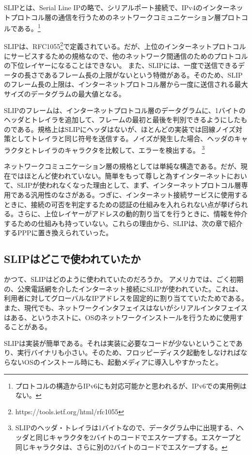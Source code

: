 SLIPとは、Serial Line IPの略で、シリアルポート接続で、IPv4のインターネットプロトコル層の通信を行うためのネットワークコミュニケーション層プロトコルである。\footnote{プロトコルの構造からIPv6にも対応可能かと思われるが、IPv6での実用例はない。}

SLIPは、RFC1055\footnote{https://tools.ietf.org/html/rfc1055}で定義されている。だが、上位のインターネットプロトコルにサービスするための規格なので、他のネットワーク間通信のためのプロトコルの下位レイヤーになることはできない。
また、SLIPには、一度で送信できるデータの長さであるフレーム長の上限がないという特徴がある。そのため、SLIPのフレーム長の上限は、インターネットプロトコル層から一度に送信される最大サイズのデータグラムの最大値となる。

SLIPのフレームは、インターネットプロトコル層のデータグラムに、1バイトのヘッダとトレイラを追加して、フレームの最初と最後を判別できるようにしたものである。規格上はSLIPにヘッダはないが、ほとんどの実装では回線ノイズ対策としてトレイラと同じ符号を送信する。ノイズが発生した場合、ヘッダのキャラクタとトレイラのキャラクタを比較して、エラーを検出する。
\footnote{SLIPのヘッダ・トレイラは1バイトなので、データグラム中に出現する、ヘッダと同じキャラクタを2バイトのコードでエスケープする。エスケープと同じキャラクタは、さらに別の2バイトのコードでエスケープする。}

ネットワークコミュニケーション層の規格としては単純な構造である。だが、現在ではほとんど使われていない。簡単をもって尊しと為すインターネットにおいて、SLIPが使われなくなった理由として、まず、インターネットプロトコル層専用である汎用性のなさがある。つぎに、インターネット接続サービスに使用するときに、接続の可否を判定するための認証の仕組みを入れられない点が挙げられる。さらに、上位レイヤーがアドレスの動的割り当てを行うときに、情報を仲介するための仕組みも持っていない。これらの理由から、SLIPは、次の章で紹介するPPPに置き換えられていった。

\subsection{SLIPはどこで使われていたか}

かつて、SLIPはどのように使われていたのだろうか。
アメリカでは、ごく初期の、公衆電話網を介したインターネット接続にSLIPが使われていた。これは、利用者に対してグローバルなIPアドレスを固定的に割り当てていたためである。
また、現代でも、ネットワークインタフェイスはないがシリアルインタフェイスはある、というホストに、OSのネットワークインストールを行うために使用することがある。

SLIPは実装が簡単である。それは実装に必要なコードが少ないということであり、実行バイナリも小さい。そのため、フロッピーディスク起動をしなければならないOSのインストール時にも、起動メディアに導入しやすかったと。

